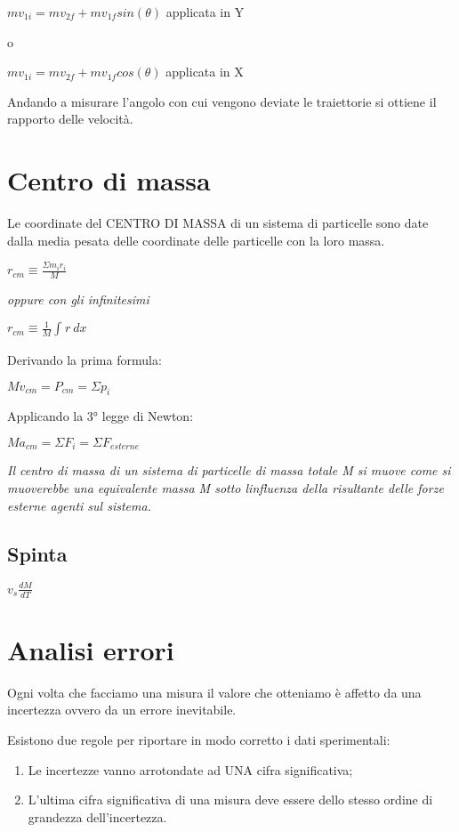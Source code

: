 \(mv_{1i} = mv_{2f} + mv_{1f}sin(\theta)\) applicata in Y

o

\(mv_{1i} = mv_{2f} + mv_{1f}cos(\theta)\) applicata in X

Andando a misurare l'angolo con cui vengono deviate le traiettorie si
ottiene il rapporto delle velocità.

\section{Centro di massa}\label{centro-di-massa}

Le coordinate del CENTRO DI MASSA di un sistema di particelle sono date
dalla media pesata delle coordinate delle particelle con la loro massa.

\(r_{cm} \equiv \frac{\Sigma m_{i}r_{i}}{M}\)

\emph{oppure con gli infinitesimi}

\(r_{cm} \equiv \frac{1}{M}\int_{}^{}r\ dx\)

Derivando la prima formula:

\(Mv_{cm} = P_{cm} = \Sigma p_{i}\)

Applicando la 3° legge di Newton:

\(Ma_{cm} = \Sigma F_{i} = \Sigma F_{esterne}\)

\emph{Il centro di massa di un sistema di particelle di massa totale M
si muove come si muoverebbe una equivalente massa M sotto
l\textquotesingle influenza della risultante delle forze esterne agenti
sul sistema.}

\subsection{Spinta}\label{spinta}

\(v_{s}\frac{dM}{dT}\)

\section{Analisi errori}\label{analisi-errori}

Ogni volta che facciamo una misura il valore che otteniamo è affetto da
una incertezza ovvero da un errore inevitabile.

Esistono due regole per riportare in modo corretto i dati sperimentali:

\begin{enumerate}
\def\labelenumi{\arabic{enumi}.}
\item
  Le incertezze vanno arrotondate ad UNA cifra significativa;
\item
  L'ultima cifra significativa di una misura deve essere dello stesso
  ordine di grandezza dell'incertezza.
\end{enumerate}

